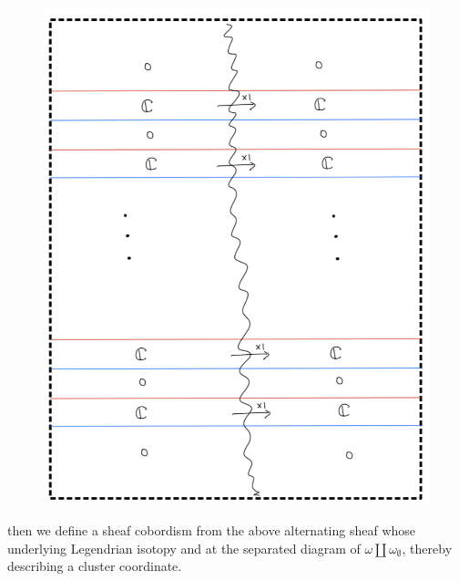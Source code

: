 \begin{figure}[H]
    \centering
    \includegraphics[scale = 0.95]{diagrams/cobord_full/2.png}
    \caption{}
    \label{fig:your-label}
\end{figure}
then we define a sheaf cobordism from the above alternating sheaf whose underlying Legendrian isotopy and at the separated diagram of $\omega \coprod \omega_\emptyset$, thereby describing a cluster coordinate.

